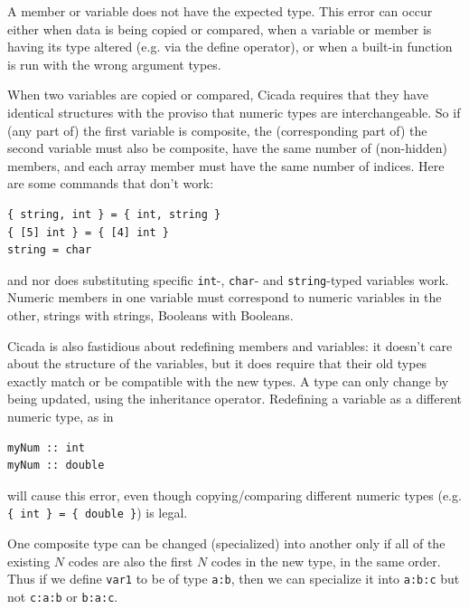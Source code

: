 \documentclass{article}
\newenvironment{code}{
       \begin{list}{}{
               \setlength{\leftmargin}{.4in}
               \setlength{\rightmargin}{0in}
               \setlength{\topsep}{.2in}
       }
       \small
       \item[] }
       { \end{list}   }
\begin{document}
A member or variable does not have the expected type.  This error can occur either when data is being copied or compared, when a variable or member is having its type altered (e.g. via the define operator), or when a built-in function is run with the wrong argument types.

When two variables are copied or compared, Cicada requires that they have identical structures with the proviso that numeric types are interchangeable.  So if (any part of) the first variable is composite, the (corresponding part of) the second variable must also be composite, have the same number of (non-hidden) members, and each array member must have the same number of indices.  Here are some commands that don't work:

\begin{code} \begin{verbatim}
{ string, int } = { int, string }
{ [5] int } = { [4] int }
string = char
\end{verbatim} \end{code}

\noindent and nor does substituting specific \verb#int#-, \verb#char#- and \verb#string#-typed variables work.  Numeric members in one variable must correspond to numeric variables in the other, strings with strings, Booleans with Booleans.

Cicada is also fastidious about redefining members and variables:  it doesn't care about the structure of the variables, but it does require that their old types exactly match or be compatible with the new types.  A type can only change by being updated, using the inheritance operator.  Redefining a variable as a different numeric type, as in

\begin{code} \begin{verbatim}
myNum :: int
myNum :: double
\end{verbatim} \end{code}

\noindent will cause this error, even though copying/comparing different numeric types (e.g. \verb#{ int } = { double }#) is legal.

One composite type can be changed (specialized) into another only if all of the existing $N$ codes are also the first $N$ codes in the new type, in the same order.  Thus if we define \verb#var1# to be of type \verb#a:b#, then we can specialize it into \verb#a:b:c# but not \verb#c:a:b# or \verb#b:a:c#.\\
\end{document}

